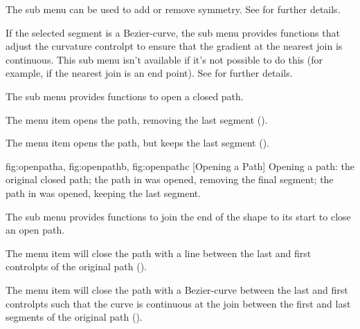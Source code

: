 The  sub menu can be used to add or remove
\gls{symmetry}.
See  for further details.


If the selected segment is a \gls{Bezier-curve}, the
 sub menu provides functions that adjust
the curvature \gls*{controlpt} to ensure that the gradient at the
nearest join is continuous. This sub menu isn't available if it's not
possible to do this (for example, if the nearest join is an end
point). See  for further details.


The  sub menu provides functions to open a
closed path.


The  menu item
opens the path, removing the last segment ().


The  menu item
opens the path, but keeps the last segment ().

{
 {fig:openpatha}{}{},
 {fig:openpathb}{}{},
 {fig:openpathc}{}{}
}
  [Opening a Path]
  {Opening a path:  the original closed path;
    the path in  was opened,
   removing the final segment;  the path in 
    was opened, keeping the last segment.}


The  sub menu provides functions to join
the end of the \gls{shape} to its start to close an open path.


The  menu item will
close the path with a line between the last and first
\glspl*{controlpt} of the original path ().


The  menu item will
close the path with a \gls{Bezier-curve} between the last and first
\glspl*{controlpt} such that the curve is continuous at the join
between the first and last segments of the original path
().

